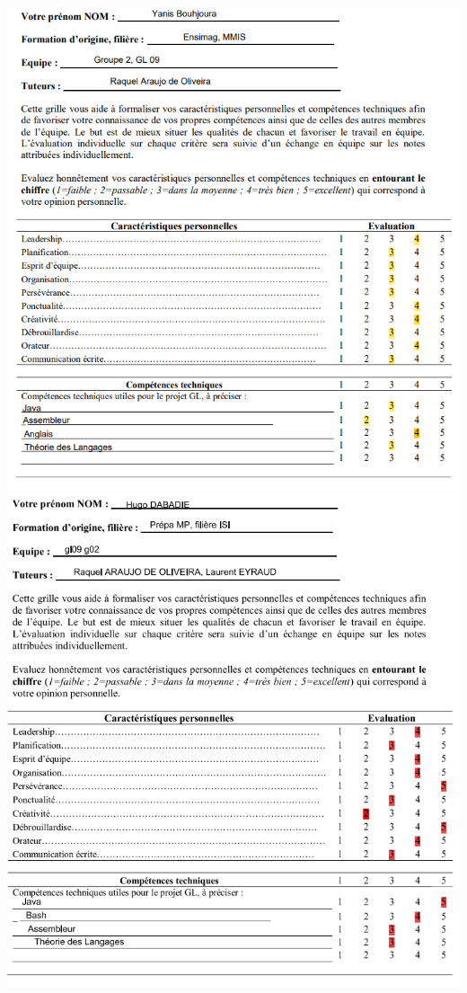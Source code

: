 \documentclass[12pt,a4paper,twoside]{article}
\begin{document}
		\includegraphics[width=1\textwidth]{Evaluation_Yanis.png}
		\newpage		
		\includegraphics[width=1\textwidth]{Evaluation_Hugo.png}
\end{document}
